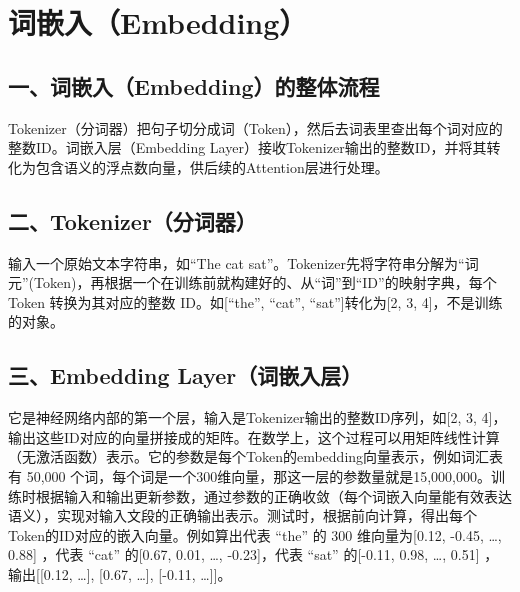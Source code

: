 \setcounter{section}{1}

\hypertarget{ux8bcdux5d4cux5165embedding}{%
\section{词嵌入（Embedding）}\label{ux8bcdux5d4cux5165embedding}}

\hypertarget{ux4e00ux8bcdux5d4cux5165embeddingux7684ux6574ux4f53ux6d41ux7a0b}{%
\subsection{一、词嵌入（Embedding）的整体流程}\label{ux4e00ux8bcdux5d4cux5165embeddingux7684ux6574ux4f53ux6d41ux7a0b}}

Tokenizer（分词器）把句子切分成词（Token），然后去词表里查出每个词对应的整数ID。词嵌入层（Embedding Layer）接收Tokenizer输出的整数ID，并将其转化为包含语义的浮点数向量，供后续的Attention层进行处理。

\hypertarget{ux4e8ctokenizerux5206ux8bcdux5668}{%
\subsection{二、Tokenizer（分词器）}\label{ux4e8ctokenizerux5206ux8bcdux5668}}

输入一个原始文本字符串，如``The cat sat''。Tokenizer先将字符串分解为``词元''(Token)，再根据一个在训练前就构建好的、从``词''到``ID''的映射字典，每个 Token 转换为其对应的整数 ID。如{[}``the'', ``cat'', ``sat''{]}转化为{[}2, 3, 4{]}，不是训练的对象。

\hypertarget{ux4e09embedding-layerux8bcdux5d4cux5165ux5c42}{%
\subsection{三、Embedding Layer（词嵌入层）}\label{ux4e09embedding-layerux8bcdux5d4cux5165ux5c42}}

它是神经网络内部的第一个层，输入是Tokenizer输出的整数ID序列，如{[}2, 3, 4{]}，输出这些ID对应的向量拼接成的矩阵。在数学上，这个过程可以用矩阵线性计算（无激活函数）表示。它的参数是每个Token的embedding向量表示，例如词汇表有 50,000 个词，每个词是一个300维向量，那这一层的参数量就是15,000,000。训练时根据输入和输出更新参数，通过参数的正确收敛（每个词嵌入向量能有效表达语义），实现对输入文段的正确输出表示。测试时，根据前向计算，得出每个Token的ID对应的嵌入向量。例如算出代表 ``the'' 的 300 维向量为{[}0.12, -0.45, \ldots, 0.88{]} ，代表 ``cat'' 的{[}0.67, 0.01, \ldots, -0.23{]}，代表 ``sat'' 的{[}-0.11, 0.98, \ldots, 0.51{]} ，输出{[}{[}0.12, \ldots{]}, {[}0.67, \ldots{]}, {[}-0.11, \ldots{]}{]}。


